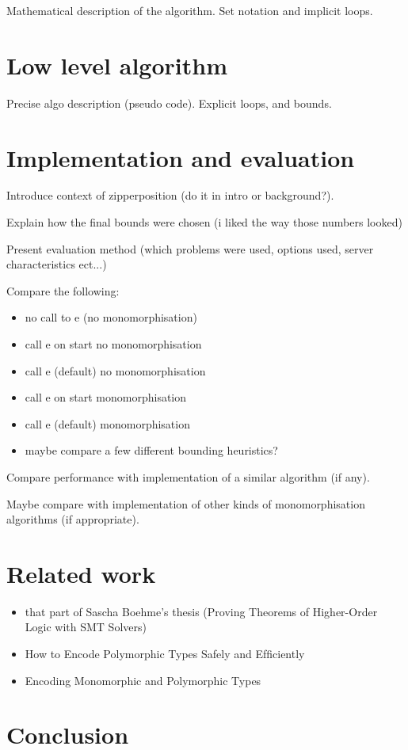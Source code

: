 \documentclass{article}
\begin{document}
Mathematical description of the algorithm. Set notation and implicit loops.

\section{Low level algorithm}

Precise algo description (pseudo code). Explicit loops, and bounds.

\section{Implementation and evaluation}

Introduce context of zipperposition (do it in intro or background?).

Explain how the final bounds were chosen (i liked the way those numbers looked)

Present evaluation method (which problems were used, options used, server characteristics ect...)

Compare the following:
    \begin{itemize}
        \item no call to e (no monomorphisation)
        \item call e on start no monomorphisation
        \item call e (default) no monomorphisation
        \item call e on start monomorphisation
        \item call e (default) monomorphisation
        \item maybe compare a few different bounding heuristics?
    \end{itemize}

Compare performance with implementation of a similar algorithm (if any).

Maybe compare with implementation of other kinds of monomorphisation algorithms (if appropriate).

\section{Related work}

\begin{itemize}
    \item that part of Sascha Boehme's thesis (Proving Theorems of Higher-Order Logic with SMT Solvers)
    \item How to Encode Polymorphic Types Safely and Efﬁciently
    \item Encoding Monomorphic and Polymorphic Types
\end{itemize}

\section{Conclusion}
\end{document}
